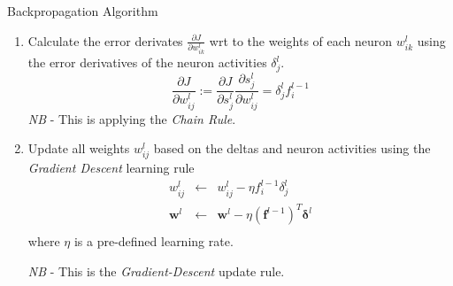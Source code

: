 \documentclass[11pt,a4paper]{article}
\begin{document}
\begin{proposition}{Backpropagation Algorithm}
\begin{enumerate}
      \item Calculate the error derivates $\frac{\partial J}{\partial w_{ik}^l}$ wrt to the weights of each neuron $w_{ik}^l$ using the error derivatives of the neuron activities $\delta_j^l$.
      \[ \frac{\partial J}{\partial w_{ij}^l}:=\frac{\partial J}{\partial s_j^l}\frac{\partial s_j^l}{\partial w_{ij}^l}=\delta_j^lf_i^{l-1} \]
      \textit{NB} - This is applying the \textit{Chain Rule}.

      \item Update all weights $w_{ij}^l$ based on the deltas and neuron activities using the \textit{Gradient Descent} learning rule
      \[\begin{array}{rcl}
        w_{ij}^l&\leftarrow& w_{ij}^l-\eta f_i^{l-1}\delta_j^l\\
        \mathbf{w}^l&\leftarrow& \mathbf{w}^l-\eta (\mathbf{f}^{l-1})^T\pmb{\delta}^l\\
      \end{array}\]
      where $\eta$ is a pre-defined learning rate.
      \par \textit{NB} - This is the \textit{Gradient-Descent} update rule.
    \end{enumerate}
  \end{proposition}
\end{document}
